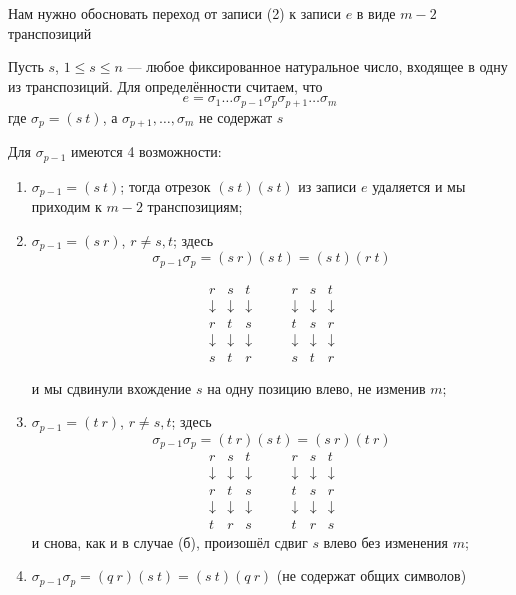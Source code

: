 \documentclass[a4paper,12pt]{article}
\theoremstyle{definition}
\theoremstyle{plain}
\theoremstyle{remark}
\begin{document}
	Нам нужно обосновать переход от записи (2) к записи $e$ в виде $m-2$ транспозиций
	
	Пусть $s$, $1 \leq s \leq n$ — любое фиксированное натуральное число, входящее в одну из транспозиций. Для определённости считаем, что
	\[
	e = \sigma_1 \dots \sigma_{p-1} \sigma_p \sigma_{p+1} \dots \sigma_m
	\]
	где $\sigma_p = (s\ t)$, а $\sigma_{p+1}, \dots, \sigma_m$ не содержат $s$
	
	Для $\sigma_{p-1}$ имеются 4 возможности:
	
	\begin{enumerate}
		\item[(а)] $\sigma_{p-1} = (s\ t)$; тогда отрезок $(s\ t)(s\ t)$ из записи $e$ удаляется и мы приходим к $m-2$ транспозициям;
		
		
		\item[б)] $\sigma_{p-1} = (s\ r)$, $r \neq s, t$; здесь
		\[
		\sigma_{p-1}\sigma_p = (s\ r)(s\ t) = (s\ t)(r\ t)
		\]
		
		\[
		\begin{array}{ccc}
		r & s & t \\
		\downarrow & \downarrow & \downarrow \\
		r & t & s \\
		\downarrow & \downarrow & \downarrow \\
		s & t & r
		\end{array}
		\quad \quad
		\begin{array}{ccc}
		r & s & t \\
		\downarrow & \downarrow & \downarrow \\
		t & s & r \\
		\downarrow & \downarrow & \downarrow \\
		s & t & r
		\end{array}
		\]
		
		и мы сдвинули вхождение $s$ на одну позицию влево, не изменив $m$;
			

		\item[(в)] $\sigma_{p-1} = (t\ r)$, $r \neq s, t$; здесь
		\[
		\sigma_{p-1}\sigma_p = (t\ r)(s\ t) = (s\ r)(t\ r)
		\]
		\[
		\begin{array}{ccc}
		r & s & t \\
		\downarrow & \downarrow & \downarrow \\
		r & t & s \\
		\downarrow & \downarrow & \downarrow \\
		t & r & s
		\end{array}
		\quad \quad
		\begin{array}{ccc}
		r & s & t \\
		\downarrow & \downarrow & \downarrow \\
		t & s & r \\
		\downarrow & \downarrow & \downarrow \\
		t & r & s
		\end{array}
		\]
		и снова, как и в случае (б), произошёл сдвиг $s$ влево без изменения $m$;
		
		\item[(г)] $\sigma_{p-1}\sigma_p = (q\ r)(s\ t) = (s\ t)(q\ r)$ (не содержат общих символов)
	\end{enumerate}
	
\end{document}
